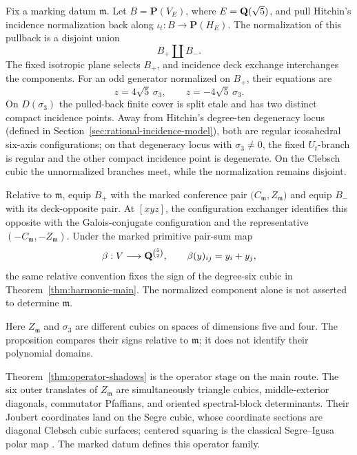 \begin{proposition}
\label{thm:marked-sheet-comparison}
Fix a marking datum \(\mathfrak m\).  Let
\(B=\mathbf P(V_E)\), where \(E=\mathbf Q(\sqrt5)\), and pull Hitchin's
incidence normalization back along \(\iota_t:B\to\mathbf P(H_E)\).
The normalization of this pullback is a disjoint union
\[
 B_+\amalg B_-.
\]
The fixed isotropic plane selects \(B_+\), and incidence deck exchange
interchanges the components.  For an odd generator normalized on \(B_+\),
their equations are
\[
 z=4\sqrt5\,\sigma_3,
 \qquad z=-4\sqrt5\,\sigma_3.
\]
On \(D(\sigma_3)\) the pulled-back finite cover is split etale and has two
distinct compact incidence points.  Away from Hitchin's degree-ten
degeneracy locus (defined in Section~\ref{sec:rational-incidence-model}),
both are regular
icosahedral six-axis configurations; on that degeneracy locus with
\(\sigma_3\ne0\), the fixed \(U_t\)-branch is regular and the other compact
incidence point is degenerate.
On the Clebsch cubic the unnormalized branches meet, while the normalization
remains disjoint.

Relative to \(\mathfrak m\), equip \(B_+\) with the marked conference pair
\(\bigl(C_{\mathfrak m},Z_{\mathfrak m}\bigr)\) and equip \(B_-\) with its
deck-opposite pair.  At \([xyz]\), the configuration exchanger identifies this
opposite with the Galois-conjugate configuration and
the representative
\((-C_{\mathfrak m},-Z_{\mathfrak m})\).  Under the marked primitive
pair-sum map
\[
 \beta:V\longrightarrow\mathbf Q^{\binom52},
 \qquad \beta(y)_{ij}=y_i+y_j,
\]
the same relative convention fixes the sign of the degree-six cubic in
Theorem~\ref{thm:harmonic-main}.  The normalized component alone is not
asserted to determine \(\mathfrak m\).
\end{proposition}

Here \(Z_{\mathfrak m}\) and \(\sigma_3\) are different cubics on spaces of
dimensions five and four.  The proposition compares their signs relative
to \(\mathfrak m\); it does not identify their polynomial domains.

Theorem~\ref{thm:operator-shadows} is the operator stage on the main route.
The six outer translates of \(Z_{\mathfrak m}\) are simultaneously triangle
cubics, middle-exterior diagonals, commutator Pfaffians, and oriented
spectral-block determinants.  Their Joubert coordinates land on the Segre cubic, whose
coordinate sections are diagonal Clebsch cubic surfaces; centered squaring is
the classical Segre--Igusa polar map
\cite[Sections~2.1--2.2]{HMSVOuter}.  The marked datum defines this operator
family.

